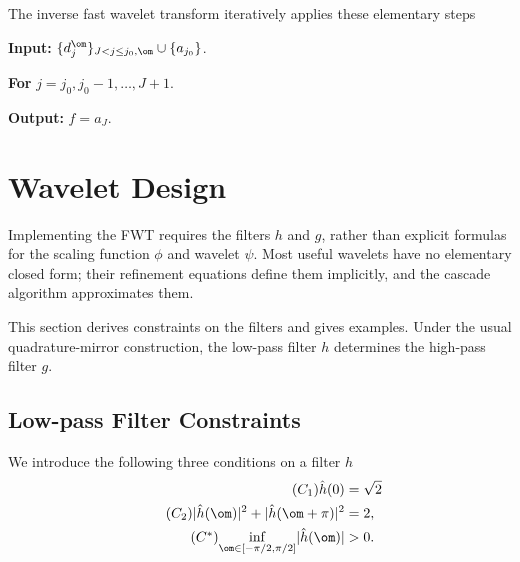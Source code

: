 
The inverse fast wavelet transform iteratively applies these elementary steps
\begin{rs}
	\item \textbf{Input:} $\{d_j^\om\}_{J<j\leq j_0,\om} \cup \{ a_{j_0} \}$.
	\item \textbf{For} $j=j_0,j_0-1,\ldots,J+1$.
	\item \textbf{Output:} $f = a_J$.
\end{rs}




\section{Wavelet Design}

Implementing the FWT requires the filters $h$ and $g$, rather than explicit formulas for the scaling function $\phi$ and wavelet $\psi$. Most useful wavelets have no elementary closed form; their refinement equations define them implicitly, and the cascade algorithm approximates them.

This section derives constraints on the filters and gives examples. Under the usual quadrature-mirror construction, the low-pass filter $h$ determines the high-pass filter $g$.


\subsection{Low-pass Filter Constraints}

We introduce the following three conditions on a filter $h$
\begin{align}
	\label{eq-cond-h-1}\tag{$C_1$}  \hat h(0)&=\sqrt{2}  \\
	\label{eq-cond-h-2}\tag{$C_2$}   |\hat h(\om)|^2 + |\hat h(\om+\pi)|^2&=2, \\
	\label{eq-cond-h-star}\tag{$C^*$}  \underset{\om \in [-\pi/2,\pi/2]}{\inf} |\hat h(\om)|&>0.
\end{align}

